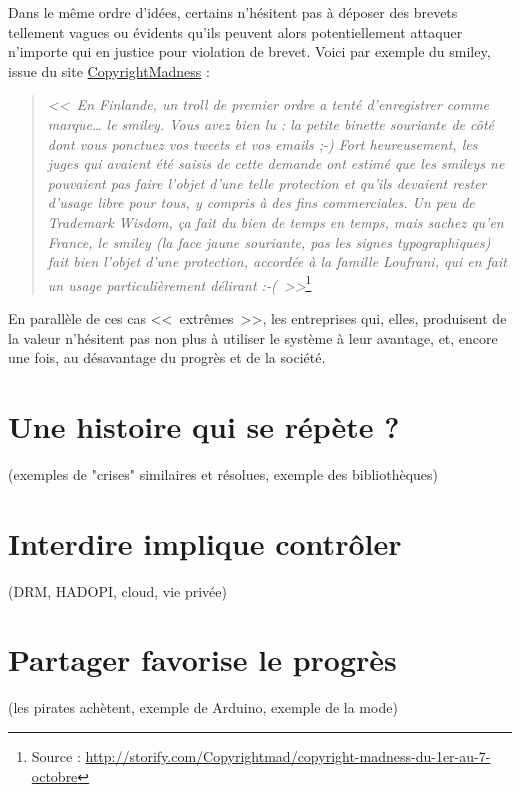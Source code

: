 Dans le même ordre d'idées, certains n'hésitent pas à déposer des brevets tellement vagues ou évidents qu'ils peuvent alors potentiellement attaquer n'importe qui en justice pour violation de brevet.
Voici par exemple du smiley, issue du site \href{http://copyrightmadness.tumblr.com/}{CopyrightMadness} :

\begin{quotation}
\textit{<<~En Finlande, un troll de premier ordre a tenté d'enregistrer comme marque\dots{} le smiley.
Vous avez bien lu : la petite binette souriante de côté dont vous ponctuez vos tweets et vos emails ;-)
Fort heureusement, les juges qui avaient été saisis de cette demande ont estimé que les smileys ne pouvaient pas faire l'objet d'une telle protection et qu'ils devaient rester d'usage libre pour tous, y compris à des fins commerciales.
Un peu de Trademark Wisdom, ça fait du bien de temps en temps, mais sachez qu'en France, le smiley (la face jaune souriante, pas les signes typographiques) fait bien l'objet d'une protection, accordée à la famille Loufrani, qui en fait un usage particulièrement délirant :-(~>>}\footnote{Source : \url{http://storify.com/Copyrightmad/copyright-madness-du-1er-au-7-octobre}}
\end{quotation}

En parallèle de ces cas <<~extrêmes~>>, les entreprises qui, elles, produisent de la valeur n'hésitent pas non plus à utiliser le système à leur avantage, et, encore une fois, au désavantage du progrès et de la société.


\section{Une histoire qui se répète ?}
(exemples de "crises" similaires et résolues, exemple des bibliothèques)
\section{Interdire implique contrôler} %
(DRM, HADOPI, cloud, vie privée)
\section{Partager favorise le progrès}
(les pirates achètent, exemple de Arduino, exemple de la mode)
